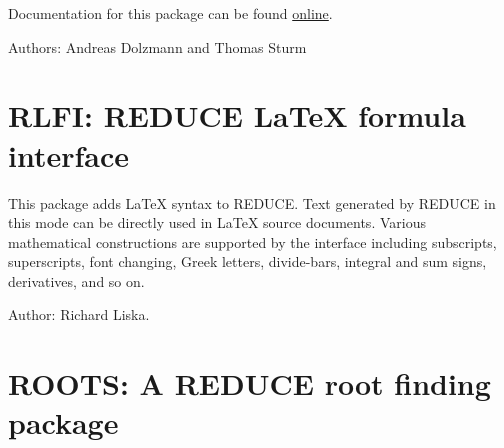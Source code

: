 Documentation for this package can be found \href{http://redlog.eu/}{online}.

Authors: Andreas Dolzmann and Thomas Sturm

\iffalse
\section{RESET: Code to reset REDUCE to its initial state}
\indexpackage{RESET}

This package defines a command RESETREDUCE that works through the
history of previous commands, and clears any values which have been
assigned, plus any rules, arrays and the like.  It also sets the various
switches to their initial values.  It is not complete, but does work for
most things that cause a gradual loss of space.  It would be relatively
easy to make it interactive, so allowing for selective resetting.

There is no further documentation on this package.

Author: John Fitch.

\fi

\newpage
\iffalse
\section{RESIDUE: A residue package}
\indexpackage{RESIDUE}

This package supports the calculation of residues of arbitrary
expressions.

Author: Wolfram Koepf.


\fi

\newpage

\section{RLFI: REDUCE \LaTeX{} formula interface}

This package adds \LaTeX{} syntax to REDUCE.  Text generated by REDUCE in
this mode can be directly used in \LaTeX{} source documents.  Various
mathematical constructions are supported by the interface including
subscripts, superscripts, font changing, Greek letters, divide-bars,
integral and sum signs, derivatives, and so on.

Author: Richard Liska.



\newpage

\iffalse
\section{ROOTS: A REDUCE root finding package}


